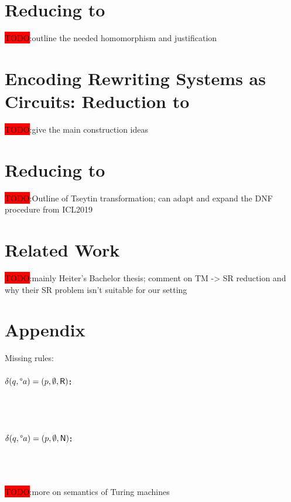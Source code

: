 \documentclass[a4paper,UKenglish,cleveref, autoref]{lipics-v2019}
\newcommand{\TODO}[1]{\colorbox{red}{\LARGE TODO}:#1}
\begin{document}
\section{Reducing \strconrew{} to \binstrconrew{}}
\TODO{outline the needed homomorphism and justification}

\section{Encoding Rewriting Systems as Circuits: Reduction to \csat{}}
\TODO{give the main construction ideas}

\section{Reducing \csat{} to \sat{}}
\TODO{Outline of Tseytin transformation; can adapt and expand the DNF procedure from ICL2019}

\section{Related Work}
\TODO{mainly Heiter's Bachelor thesis; comment on TM -> SR reduction and why their SR problem isn't suitable for our setting}

\appendix
\section{Appendix}
Missing rules:
\paragraph*{$\delta(q, \degree a) = (p, \emptyset, \textsf{R})$:}
\begin{center}
   \\[3ex]
   \\[3ex]
\end{center}

\paragraph*{$\delta(q, \degree a) = (p, \emptyset, \textsf{N})$:}
\begin{center}
   \\[3ex]
   \\[3ex]
\end{center}

\TODO{more on semantics of Turing machines}

{}
\end{document}

